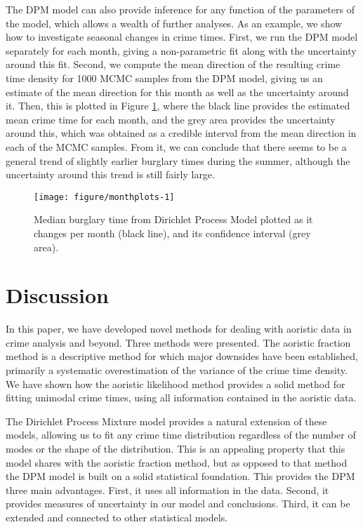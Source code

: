 The DPM model can also provide inference for any function of the parameters of the model, which allows a wealth of further analyses. As an example, we show how to investigate seasonal changes in crime times. First, we run the DPM model separately for each month, giving a non-parametric fit along with the uncertainty around this fit. Second, we compute the mean direction of the resulting crime time density for 1000 MCMC samples from the DPM model, giving us an estimate of the mean direction for this month as well as the uncertainty around it. Then, this is plotted in Figure \ref{month_plot}, where the black line provides the estimated mean crime time for each month, and the grey area provides the uncertainty around this, which was obtained as a credible interval from the mean direction in each of the MCMC samples. From it, we can conclude that there seems to be a general trend of slightly earlier burglary times during the summer, although the uncertainty around this trend is still fairly large.

\begin{figure}
\centering
\begin{knitrout}
\color{fgcolor}
\texttt{[image: figure/monthplots-1]} 

\end{knitrout}
\caption{Median burglary time from Dirichlet Process Model plotted as it changes per month (black line), and its confidence interval (grey area).} \label{month_plot}
\end{figure}



\section{Discussion} \label{secaor:discussion}

In this paper, we have developed novel methods for dealing with aoristic data in crime analysis and beyond. Three methods were presented. The aoristic fraction method is a descriptive method for which major downsides have been established, primarily a systematic overestimation of the variance of the crime time density. We have shown how the aoristic likelihood method provides a solid method for fitting unimodal crime times, using all information contained in the aoristic data.

The Dirichlet Process Mixture model provides a natural extension of these models, allowing us to fit any crime time distribution regardless of the number of modes or the shape of the distribution. This is an appealing property that this model shares with the aoristic fraction method, but as opposed to that method the DPM model is built on a solid statistical foundation. This provides the DPM three main advantages. First, it uses all information in the data. Second, it provides measures of uncertainty in our model and conclusions. Third, it can be extended and connected to other statistical models.

